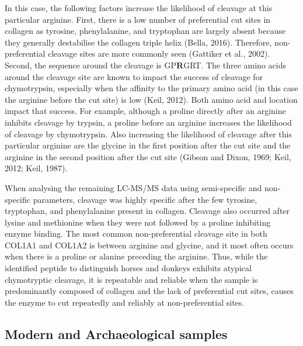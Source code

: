 \documentclass[preprint, 3p, authoryear]{elsarticle} %
\begin{document}
In this case, the following factors increase the likelihood of cleavage at this particular arginine. First, there is a low number of preferential cut sites in collagen as tyrosine, phenylalanine, and tryptophan are largely absent because they generally destabilise the collagen triple helix (Bella, 2016). Therefore, non-preferential cleavage sites are more commonly seen (Gattiker et al., 2002). Second, the sequence around the cleavage is GP\textbf{R}GRT. The three amino acids around the cleavage site are known to impact the success of cleavage for chymotrypsin, especially when the affinity to the primary amino acid (in this case the arginine before the cut site) is low (Keil, 2012). Both amino acid and location impact that success. For example, although a proline directly after an arginine inhibits cleavage by trypsin, a proline before an arginine increases the likelihood of cleavage by chymotrypsin. Also increasing the likelihood of cleavage after this particular arginine are the glycine in the first position after the cut site and the arginine in the second position after the cut site (Gibson and Dixon, 1969; Keil, 2012; Keil, 1987).

When analysing the remaining LC-MS/MS data using semi-specific and non-specific parameters, cleavage was highly specific after the few tyrosine, tryptophan, and phenylalanine present in collagen. Cleavage also occurred after lysine and methionine when they were not followed by a proline inhibiting enzyme binding. The most common non-preferential cleavage site in both COL1A1 and COL1A2 is between arginine and glycine, and it most often occurs when there is a proline or alanine preceding the arginine. Thus, while the identified peptide to distinguish horses and donkeys exhibits atypical chymotryptic cleavage, it is repeatable and reliable when the sample is predominantly composed of collagen and the lack of preferential cut sites, causes the enzyme to cut repeatedly and reliably at non-preferential sites.

\hypertarget{modern-and-archaeological-samples}{%
\subsection{Modern and Archaeological samples}\label{modern-and-archaeological-samples}}
\end{document}
